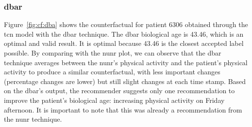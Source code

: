 \subsubsection{\gls{dbar}}
Figure~\ref{fig:cf:dba} shows the counterfactual for patient $6306$ obtained through the \gls{tcn} model with the \gls{dbar} technique.
The \gls{dbar} biological age is 43.46, which is an optimal and valid result. It is optimal because 43.46 is the closest accepted label possible. By comparing with the \gls{nunr} plot, we can observe that the \gls{dbar} technique averages between the \gls{nunr}'s physical activity and the patient's physical activity to produce a similar counterfactual, with less important changes (percentage changes are lower) but still slight changes at each time stamp. Based on the \gls{dbar}'s output, the recommender suggests only one recommendation to improve the patient's biological age: increasing physical activity on Friday afternoon. It is important to note that this was already a recommendation from the \gls{nunr} technique.

